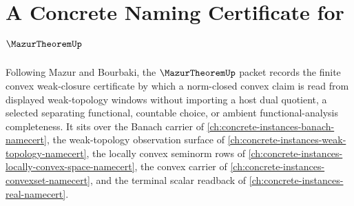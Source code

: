 \chapter{A Concrete Naming Certificate for $\MazurTheoremUp$}
\label{ch:concrete-instances-mazur-theorem-namecert}

Following Mazur and Bourbaki, the $\MazurTheoremUp$ packet records the finite convex weak-closure certificate by which a norm-closed convex claim is read from displayed weak-topology windows without importing a host dual quotient, a selected separating functional, countable choice, or ambient functional-analysis completeness. It sits over the Banach carrier of \autoref{ch:concrete-instances-banach-namecert}, the weak-topology observation surface of \autoref{ch:concrete-instances-weak-topology-namecert}, the locally convex seminorm rows of \autoref{ch:concrete-instances-locally-convex-space-namecert}, the convex carrier of \autoref{ch:concrete-instances-convexset-namecert}, and the terminal scalar readback of \autoref{ch:concrete-instances-real-namecert}.

